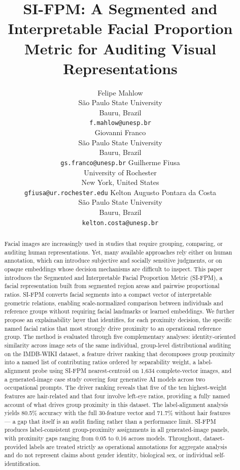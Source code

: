 \documentclass{article}
\title{SI-FPM: A Segmented and Interpretable Facial Proportion Metric for Auditing Visual Representations
}
\author{
  Felipe Mahlow \orcidlink{0000-0001-9816-1440}\\
  São Paulo State University\\
  Bauru, Brazil\\
  \texttt{f.mahlow@unesp.br} \\
  \And
  Giovanni Franco \orcidlink{0009-0002-8588-8979}\\
  São Paulo State University\\
  Bauru, Brazil\\
  \texttt{gs.franco@unesp.br}
  \And
  Guilherme Fiusa \orcidlink{0000-0002-2390-7823}\\
  University of Rochester\\
  New York, United States\\
  \texttt{gfiusa@ur.rochester.edu}
  \And
  Kelton Augusto Pontara da Costa \orcidlink{0000-0001-5458-3908}\\
  São Paulo State University\\
  Bauru, Brazil\\
  \texttt{kelton.costa@unesp.br} \\
}
\begin{document}
\maketitle

\begin{abstract}
Facial images are increasingly used in studies that require grouping, comparing, or auditing human representations. Yet, many available approaches rely either on human annotation, which can introduce subjective and socially sensitive judgments, or on opaque embeddings whose decision mechanisms are difficult to inspect. This paper introduces the Segmented and Interpretable Facial Proportion Metric (SI-FPM), a facial representation built from segmented region areas and pairwise proportional ratios. SI-FPM converts facial segments into a compact vector of interpretable geometric relations, enabling scale-normalized comparison between individuals and reference groups without requiring facial landmarks or learned embeddings. We further propose an explainability layer that identifies, for each proximity decision, the specific named facial ratios that most strongly drive proximity to an operational reference group. The method is evaluated through five complementary analyses: identity-oriented similarity across image sets of the same individual, group-level distributional auditing on the IMDB-WIKI dataset, a feature driver ranking that decomposes group proximity into a named list of contributing ratios ordered by separability weight, a label-alignment probe using SI-FPM nearest-centroid on 1,634 complete-vector images, and a generated-image case study covering four generative AI models across two occupational prompts. The driver ranking reveals that five of the ten highest-weight features are hair-related and that four involve left-eye ratios, providing a fully named account of what drives group proximity in this dataset. The label-alignment analysis yields 80.5\% accuracy with the full 30-feature vector and 71.7\% without hair features — a gap that itself is an audit finding rather than a performance limit. SI-FPM produces label-consistent group-proximity assignments in all generated-image panels, with proximity gaps ranging from 0.05 to 0.16 across models. Throughout, dataset-provided labels are treated strictly as operational annotations for aggregate analysis and do not represent claims about gender identity, biological sex, or individual self-identification.
\end{abstract}

\end{document}
